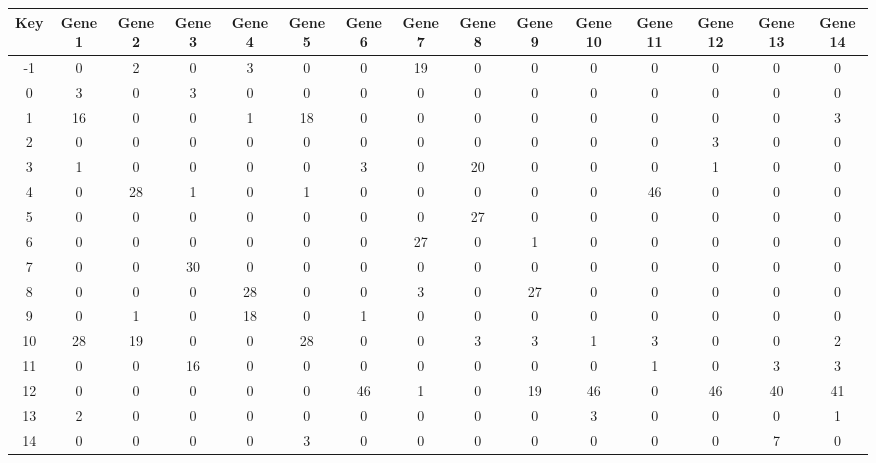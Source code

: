 \begin{tabular}{|c|c|c|c|c|c|c|c|c|c|c|c|c|c|c|}
\hline
Key & Gene 1 & Gene 2 & Gene 3 & Gene 4 & Gene 5 & Gene 6 & Gene 7 & Gene 8 & Gene 9 & Gene 10 & Gene 11 & Gene 12 & Gene 13 & Gene 14 \\
\hline
-1 & 0 & 2 & 0 & 3 & 0 & 0 & 19 & 0 & 0 & 0 & 0 & 0 & 0 & 0 \\
0 & 3 & 0 & 3 & 0 & 0 & 0 & 0 & 0 & 0 & 0 & 0 & 0 & 0 & 0 \\
1 & 16 & 0 & 0 & 1 & 18 & 0 & 0 & 0 & 0 & 0 & 0 & 0 & 0 & 3 \\
2 & 0 & 0 & 0 & 0 & 0 & 0 & 0 & 0 & 0 & 0 & 0 & 3 & 0 & 0 \\
3 & 1 & 0 & 0 & 0 & 0 & 3 & 0 & 20 & 0 & 0 & 0 & 1 & 0 & 0 \\
4 & 0 & 28 & 1 & 0 & 1 & 0 & 0 & 0 & 0 & 0 & 46 & 0 & 0 & 0 \\
5 & 0 & 0 & 0 & 0 & 0 & 0 & 0 & 27 & 0 & 0 & 0 & 0 & 0 & 0 \\
6 & 0 & 0 & 0 & 0 & 0 & 0 & 27 & 0 & 1 & 0 & 0 & 0 & 0 & 0 \\
7 & 0 & 0 & 30 & 0 & 0 & 0 & 0 & 0 & 0 & 0 & 0 & 0 & 0 & 0 \\
8 & 0 & 0 & 0 & 28 & 0 & 0 & 3 & 0 & 27 & 0 & 0 & 0 & 0 & 0 \\
9 & 0 & 1 & 0 & 18 & 0 & 1 & 0 & 0 & 0 & 0 & 0 & 0 & 0 & 0 \\
10 & 28 & 19 & 0 & 0 & 28 & 0 & 0 & 3 & 3 & 1 & 3 & 0 & 0 & 2 \\
11 & 0 & 0 & 16 & 0 & 0 & 0 & 0 & 0 & 0 & 0 & 1 & 0 & 3 & 3 \\
12 & 0 & 0 & 0 & 0 & 0 & 46 & 1 & 0 & 19 & 46 & 0 & 46 & 40 & 41 \\
13 & 2 & 0 & 0 & 0 & 0 & 0 & 0 & 0 & 0 & 3 & 0 & 0 & 0 & 1 \\
14 & 0 & 0 & 0 & 0 & 3 & 0 & 0 & 0 & 0 & 0 & 0 & 0 & 7 & 0 \\
\hline
\end{tabular}